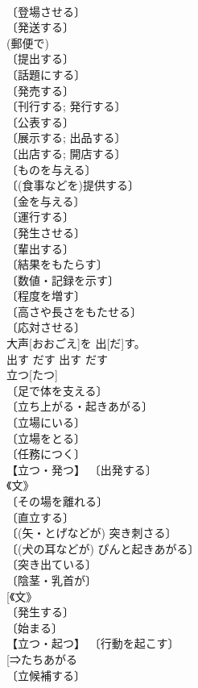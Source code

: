 \documentclass[8pt]{extreport}
\begin{document}
\begin{CJK}{UTF8}{min}
\\	〔登場させる〕 
\\	〔発送する〕 
\\	(郵便で) 
\\	〔提出する〕 
\\	〔話題にする〕 
\\	〔発売する〕 
\\	〔刊行する; 発行する〕 
\\	〔公表する〕 
\\	〔展示する; 出品する〕 
\\	〔出店する; 開店する〕 
\\	〔ものを与える〕 
\\	〔(食事などを)提供する〕 
\\	〔金を与える〕 
\\	〔運行する〕 
\\	〔発生させる〕 
\\	〔輩出する〕 
\\	〔結果をもたらす〕 
\\	〔数値・記録を示す〕 
\\	〔程度を増す〕 
\\	〔高さや長さをもたせる〕 
\\	〔応対させる〕 
\\	大声[おおごえ]を 出[だ]す。	
\\	出す	だす	出す	だす	
\\	立つ[たつ]	
\\	〔足で体を支える〕 
\\	〔立ち上がる・起きあがる〕 
\\	〔立場にいる〕 
\\	〔立場をとる〕 
\\	〔任務につく〕 
\\	【立つ・発つ】 〔出発する〕 
\\	《文》 
\\	〔その場を離れる〕 
\\	〔直立する〕 
\\	〔(矢・とげなどが) 突き刺さる〕 
\\	〔(犬の耳などが) ぴんと起きあがる〕 
\\	〔突き出ている〕 
\\	〔陰茎・乳首が〕 
\\	[《文》 
\\	〔発生する〕 
\\	〔始まる〕 
\\	【立つ・起つ】 〔行動を起こす〕 
\\	[⇒たちあがる 
\\	〔立候補する〕 

\end{CJK}
\end{document}
